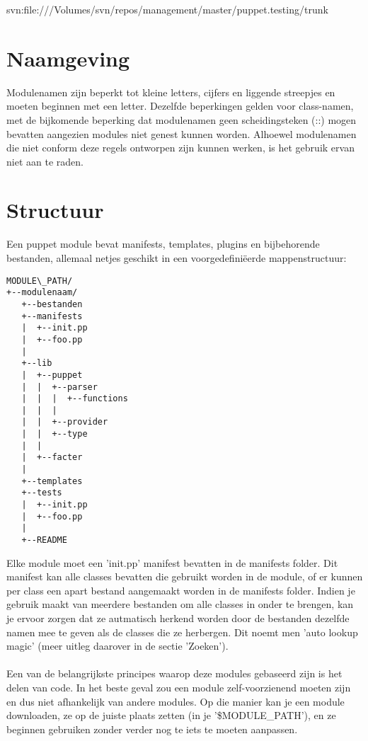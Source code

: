 svn:file:///Volumes/svn/repos/management/master/puppet.testing/trunk

\section{Naamgeving}
Modulenamen zijn beperkt tot kleine letters, cijfers en liggende streepjes en moeten beginnen met een letter. Dezelfde beperkingen gelden voor class-namen, met de bijkomende beperking dat modulenamen geen scheidingsteken (::) mogen bevatten aangezien modules niet genest kunnen worden. Alhoewel modulenamen die niet conform deze regels ontworpen zijn kunnen werken, is het gebruik ervan niet aan te raden.
%
\section{Structuur}
Een puppet module bevat manifests, templates, plugins en bijbehorende bestanden, allemaal netjes geschikt in een voorgedefini\"eerde mappenstructuur:
%
\begin{code}
\begin{lstlisting}
MODULE\_PATH/
+--modulenaam/
   +--bestanden
   +--manifests
   |  +--init.pp
   |  +--foo.pp
   |
   +--lib
   |  +--puppet
   |  |  +--parser
   |  |  |  +--functions
   |  |  |
   |  |  +--provider
   |  |  +--type
   |  |
   |  +--facter
   |
   +--templates
   +--tests
   |  +--init.pp
   |  +--foo.pp
   |
   +--README
\end{lstlisting}
\end{code}
%
Elke module moet een 'init.pp' manifest bevatten in de manifests folder. Dit manifest kan alle classes bevatten die gebruikt worden in de module, of er kunnen per class een apart bestand aangemaakt worden in de manifests folder. Indien je gebruik maakt van meerdere bestanden om alle classes in onder te brengen, kan je ervoor zorgen dat ze autmatisch herkend worden door de bestanden dezelfde namen mee te geven als de classes die ze herbergen. Dit noemt men 'auto lookup magic' (meer uitleg daarover in de sectie 'Zoeken').\\\\
%
Een van de belangrijkste principes waarop deze modules gebaseerd zijn is het delen van code. In het beste geval zou een module zelf-voorzienend moeten zijn en dus niet afhankelijk van andere modules. Op die manier kan je een module downloaden, ze op de juiste plaats zetten (in je '\$MODULE\_PATH'), en ze beginnen gebruiken zonder verder nog te iets te moeten aanpassen.\\\\

